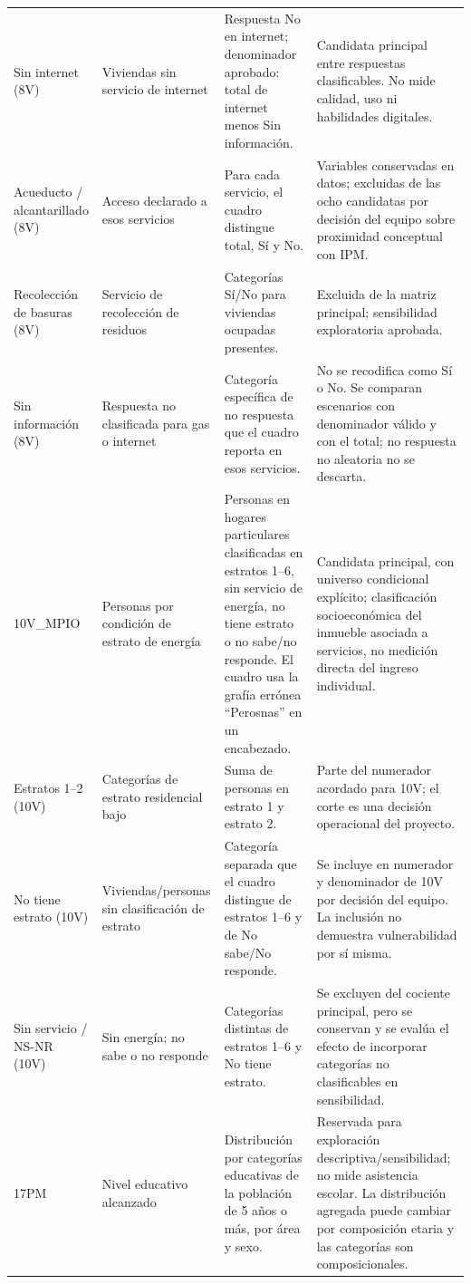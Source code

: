 \begin{singlespace}
\begin{longtable}{@{}p{}p{}p{}p{}@{}}
Sin internet (8V) & Viviendas sin servicio de internet & Respuesta No en internet; denominador aprobado: total de internet menos Sin información. & Candidata principal entre respuestas clasificables. No mide calidad, uso ni habilidades digitales.\\
Acueducto / alcantarillado (8V) & Acceso declarado a esos servicios & Para cada servicio, el cuadro distingue total, Sí y No. & Variables conservadas en datos; excluidas de las ocho candidatas por decisión del equipo sobre proximidad conceptual con IPM.\\
Recolección de basuras (8V) & Servicio de recolección de residuos & Categorías Sí/No para viviendas ocupadas presentes. & Excluida de la matriz principal; sensibilidad exploratoria aprobada.\\
Sin información (8V) & Respuesta no clasificada para gas o internet & Categoría específica de no respuesta que el cuadro reporta en esos servicios. & No se recodifica como Sí o No. Se comparan escenarios con denominador válido y con el total; no respuesta no aleatoria no se descarta.\\
10V\_MPIO & Personas por condición de estrato de energía & Personas en hogares particulares clasificadas en estratos 1--6, sin servicio de energía, no tiene estrato o no sabe/no responde. El cuadro usa la grafía errónea \enquote{Perosnas} en un encabezado. & Candidata principal, con universo condicional explícito; clasificación socioeconómica del inmueble asociada a servicios, no medición directa del ingreso individual.\\
Estratos 1--2 (10V) & Categorías de estrato residencial bajo & Suma de personas en estrato 1 y estrato 2. & Parte del numerador acordado para 10V; el corte es una decisión operacional del proyecto.\\
No tiene estrato (10V) & Viviendas/personas sin clasificación de estrato & Categoría separada que el cuadro distingue de estratos 1--6 y de No sabe/No responde. & Se incluye en numerador y denominador de 10V por decisión del equipo. La inclusión no demuestra vulnerabilidad por sí misma.\\
Sin servicio / NS-NR (10V) & Sin energía; no sabe o no responde & Categorías distintas de estratos 1--6 y No tiene estrato. & Se excluyen del cociente principal, pero se conservan y se evalúa el efecto de incorporar categorías no clasificables en sensibilidad.\\
17PM & Nivel educativo alcanzado & Distribución por categorías educativas de la población de 5 años o más, por área y sexo. & Reservada para exploración descriptiva/sensibilidad; no mide asistencia escolar. La distribución agregada puede cambiar por composición etaria y las categorías son composicionales.\\

\end{longtable}
\end{singlespace}
